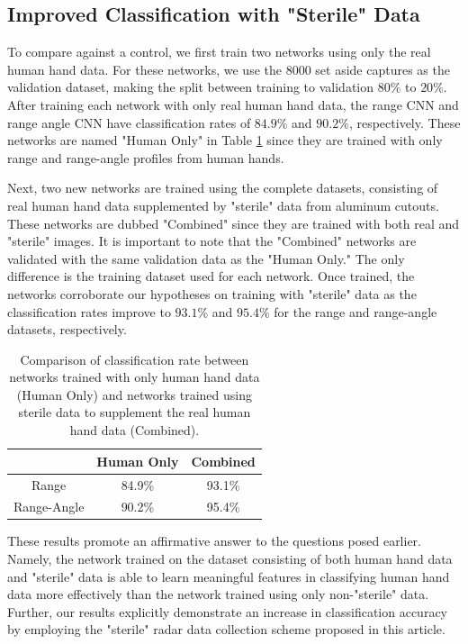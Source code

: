 \documentclass{ieeeaccess}
\begin{document}
\subsection{Improved Classification with "Sterile" Data}
\label{subsec:improved_classification_with_sterile_data}
To compare against a control, we first train two networks using only the real human hand data. For these networks, we use the $8000$ set aside captures as the validation dataset, making the split between training to validation $80\%$ to $20\%$. After training each network with only real human hand data, the range CNN and range angle CNN have classification rates of $84.9\%$ and $90.2\%$, respectively. These networks are named "Human Only" in Table \ref{tab:results} since they are trained with only range and range-angle profiles from human hands. 

Next, two new networks are trained using the complete datasets, consisting of real human hand data supplemented by "sterile" data from aluminum cutouts. These networks are dubbed "Combined" since they are trained with both real and "sterile" images. It is important to note that the "Combined" networks are validated with the same validation data as the "Human Only." The only difference is the training dataset used for each network. Once trained, the networks corroborate our hypotheses on training with "sterile" data as the classification rates improve to $93.1\%$ and $95.4\%$ for the range and range-angle datasets, respectively. 

\begin{table}[h]
    \centering
    \large
    \begin{tabular}{c|c c}
         & Human Only & Combined \\
         \hline
         Range & 84.9\% & 93.1\% \\
         Range-Angle & 90.2\% & 95.4\%
    \end{tabular}
    \caption{Comparison of classification rate between networks trained with only human hand data (Human Only) and networks trained using sterile data to supplement the real human hand data (Combined).}
    \label{tab:results}
\end{table}

These results promote an affirmative answer to the questions posed earlier. Namely, the network trained on the dataset consisting of both human hand data and "sterile" data is able to learn meaningful features in classifying human hand data more effectively than the network trained using only non-"sterile" data. Further, our results explicitly demonstrate an increase in classification accuracy by employing the "sterile" radar data collection scheme proposed in this article. 
\end{document}
